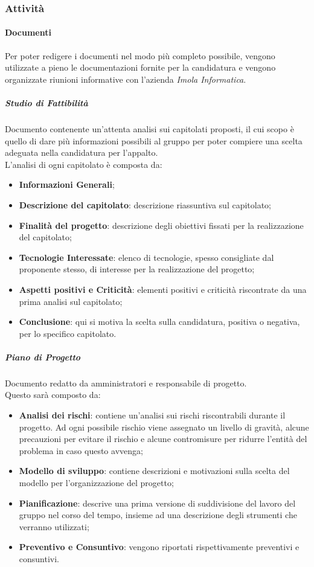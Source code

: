 \subsubsection{Attività}
\paragraph{Documenti}
Per poter redigere i documenti nel modo più completo possibile, vengono utilizzate a pieno le documentazioni fornite per la candidatura e vengono organizzate riunioni informative con l'azienda  \textit{Imola Informatica}.
    
    \subparagraph*{Studio di Fattibilità}  \hfill \break
     Documento contenente un'attenta analisi sui capitolati proposti, il cui scopo è quello di dare più informazioni possibili al gruppo per poter compiere una scelta adeguata nella candidatura per l'appalto. \\
     L'analisi di ogni capitolato è composta da:
     \begin{itemize}
         \item \textbf{Informazioni Generali};
         \item \textbf{Descrizione del capitolato}: descrizione riassuntiva sul capitolato;
        \item \textbf{Finalità del progetto}: descrizione degli obiettivi fissati per la realizzazione del capitolato;
         \item \textbf{Tecnologie Interessate}: elenco di tecnologie, spesso consigliate dal proponente stesso, di interesse per la realizzazione del progetto;
         \item \textbf{Aspetti positivi e Criticità}: elementi positivi e criticità riscontrate da una prima analisi sul capitolato;
         \item \textbf{Conclusione}: qui si motiva la scelta sulla candidatura, positiva o negativa, per lo specifico capitolato.
    \end{itemize} 
     
    \subparagraph*{Piano di Progetto}  \hfill \break
    Documento redatto da amministratori e responsabile di progetto. \\
Questo sarà composto da:
    \begin{itemize}
        \item \textbf{Analisi dei rischi}: contiene un'analisi sui rischi riscontrabili durante il progetto. Ad ogni possibile rischio viene assegnato un livello di gravità, alcune precauzioni per evitare il rischio e alcune contromisure per ridurre l'entità del problema in caso questo avvenga; 
        \item \textbf{Modello di sviluppo}: contiene descrizioni e motivazioni sulla scelta del modello per l'organizzazione del progetto;
        \item \textbf{Pianificazione}: descrive una prima versione di suddivisione del lavoro del gruppo nel corso del tempo, insieme ad una descrizione degli strumenti che verranno utilizzati;
        \item \textbf{Preventivo e Consuntivo}: vengono riportati rispettivamente preventivi e consuntivi.
    \end{itemize}

